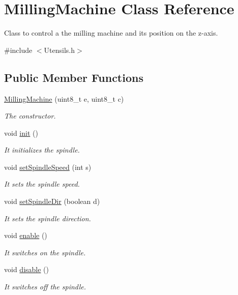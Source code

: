 \hypertarget{class_milling_machine}{\section{Milling\+Machine Class Reference}
\label{class_milling_machine}
}


Class to control a the milling machine and its position on the z-\/axis.  




{\ttfamily \#include $<$Utensils.\+h$>$}

\subsection*{Public Member Functions}
\begin{DoxyCompactItemize}
\item 
\hyperlink{class_milling_machine_afdeaae37d959bd4c9de40195a2650aa4}{Milling\+Machine} (uint8\+\_\+t e, uint8\+\_\+t c)
\begin{DoxyCompactList}\small\item\em The constructor. \end{DoxyCompactList}\item 
void \hyperlink{class_milling_machine_ad8b30fc42959606e9773e5ae7e31bac7}{init} ()
\begin{DoxyCompactList}\small\item\em It initializes the spindle. \end{DoxyCompactList}\item 
void \hyperlink{class_milling_machine_a4c41fa0e6f882281ffc3b67a1771da57}{set\+Spindle\+Speed} (int s)
\begin{DoxyCompactList}\small\item\em It sets the spindle speed. \end{DoxyCompactList}\item 
void \hyperlink{class_milling_machine_a5c49cbbcd45406c9537ccac8f7c22c39}{set\+Spindle\+Dir} (boolean d)
\begin{DoxyCompactList}\small\item\em It sets the spindle direction. \end{DoxyCompactList}\item 
void \hyperlink{class_milling_machine_af965377184ed3bc3ed56763cd652d10f}{enable} ()
\begin{DoxyCompactList}\small\item\em It switches on the spindle. \end{DoxyCompactList}\item 
void \hyperlink{class_milling_machine_a6e1eb0b5f72e31ad0505b5f61613831d}{disable} ()
\begin{DoxyCompactList}\small\item\em It switches off the spindle. \end{DoxyCompactList}\end{DoxyCompactItemize}
